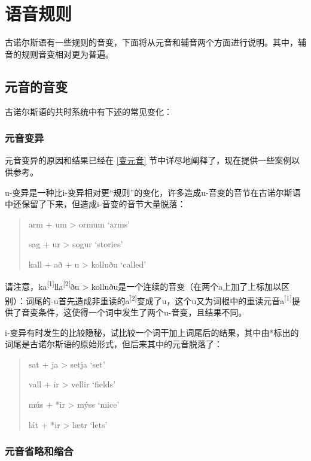 \section{语音规则}
\label{语音规则}

古诺尔斯语有一些规则的音变，下面将从元音和辅音两个方面进行说明。其中，辅音的规则音变相对更为普遍。

\subsection{元音的音变}
\label{元音的音变}

古诺尔斯语的共时系统中有下述的常见变化：
\subsubsection{元音变异}
\label{元音变异}

  
  元音变异的原因和结果已经在 \ref{变元音} 节中详尽地阐释了，现在提供一些案例以供参考。

  u-变异是一种比i-变异相对更``规则''的变化，许多造成u-音变的音节在古诺尔斯语中还保留了下来，但造成i-音变的音节大量脱落：
  
  \begin{quote}
    arm + um \textgreater{} ormum `arms'
  
    sag + ur \textgreater{} sogur `stories'
  
    kall + að + u \textgreater{} kolluðu `called'
  \end{quote}

  请注意，ka\textsuperscript{[1]}lla\textsuperscript{[2]}ðu \textgreater{} kolluðu是一个连续的音变（在两个a上加了上标加以区别）：词尾的-u首先造成非重读的a\textsuperscript{[2]}变成了u，这个u又为词根中的重读元音a\textsuperscript{[1]}提供了音变条件，这使得一个词中发生了两个u-音变，且结果不同。

i-变异有时发生的比较隐秘，试比较一个词干加上词尾后的结果，其中由*标出的词尾是古诺尔斯语的原始形式，但后来其中的元音脱落了：

    \begin{quote}
    sat + ja \textgreater{} setja `set'

    vall + ir \textgreater{} vellir `fields'

    mús + *ir \textgreater{} mýss `mice'

    lát + *ir \textgreater{} lætr `lets'
    \end{quote}


\subsubsection{元音省略和缩合}
\label{元音省略和缩合}
    

